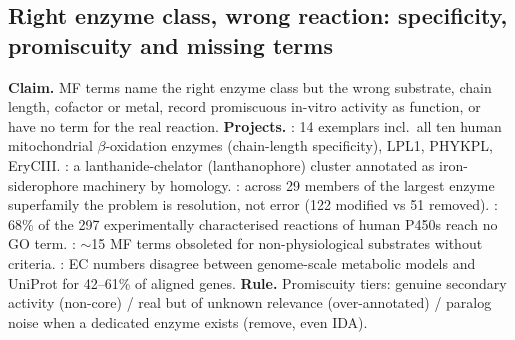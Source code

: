 \subsection{Right enzyme class, wrong reaction: specificity, promiscuity and missing terms}\label{sec:dd-enzyme}
\textbf{Claim.} MF terms name the right enzyme class but the wrong substrate, chain length, cofactor
or metal, record promiscuous in-vitro activity as function, or have no term for the real reaction.
\textbf{Projects.} : 14 exemplars incl.\ all ten human mitochondrial
$\beta$-oxidation enzymes (chain-length specificity), LPL1, PHYKPL, EryCIII.
: a lanthanide-chelator (lanthanophore) cluster annotated as iron-siderophore
machinery by homology. : across 29 members of the largest enzyme superfamily the
problem is resolution, not error (122 modified vs 51 removed). : 68\% of the
297 experimentally characterised reactions of human P450s reach no GO term.
: $\sim$15 MF terms obsoleted for non-physiological substrates
without criteria. : EC numbers disagree between genome-scale
metabolic models and UniProt for 42--61\% of aligned genes.
\textbf{Rule.} Promiscuity tiers: genuine secondary activity (non-core) / real but of unknown relevance
(over-annotated) / paralog noise when a dedicated enzyme exists (remove, even IDA).
